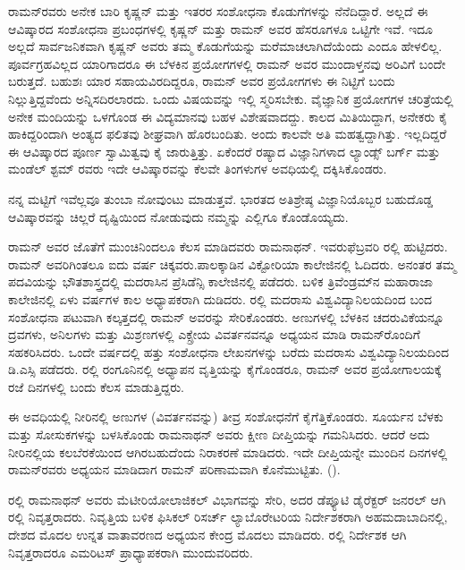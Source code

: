 ರಾಮನ್‍ರವರು ಅನೇಕ ಬಾರಿ ಕೃಷ್ಣನ್ ಮತ್ತು ಇತರರ ಸಂಶೋಧನಾ ಕೊಡುಗೆಗಳನ್ನು ನೆನೆದಿದ್ದಾರೆ. ಅಲ್ಲದೆ ಈ ಆವಿಷ್ಕಾರದ ಸಂಶೋಧನಾ ಪ್ರಬಂಧಗಳಲ್ಲಿ ಕೃಷ್ಣನ್ ಮತ್ತು ರಾಮನ್ ಅವರ ಹೆಸರೂಗಳೂ ಒಟ್ಟಿಗೇ ಇವೆ. ಇದೂ ಅಲ್ಲದೆ ಸಾರ್ವಜನಿಕವಾಗಿ ಕೃಷ್ಣನ್ ಅವರು ತಮ್ಮ ಕೊಡುಗೆಯನ್ನು ಮರೆಮಾಚಲಾಗಿದೆಯೆಂದು ಎಂದೂ ಹೇಳಲಿಲ್ಲ. ಪೂರ್ವಗ್ರಹವಿಲ್ಲದ ಯಾರಿಗಾದರೂ ಈ ಬೆಳಕಿನ ಪ್ರಯೋಗಗಳಲ್ಲಿ ರಾಮನ್ ಅವರ ಮುಂದಾಳ್ತನವು ಅರಿವಿಗೆ ಬಂದೇ ಬರುತ್ತದೆ. ಬಹುಶಃ ಯಾರ ಸಹಾಯವಿರದಿದ್ದರೂ, ರಾಮನ್ ಅವರ ಪ್ರಯೋಗಗಳು ಈ ನಿಟ್ಟಿಗೆ ಬಂದು ನಿಲ್ಲುತ್ತಿದ್ದವೆಂದು ಅನ್ನಿಸದಿರಲಾರದು. ಒಂದು ವಿಷಯವನ್ನು ಇಲ್ಲಿ ಸ್ಮರಿಸಬೇಕು. ವೈಜ್ಞಾನಿಕ ಪ್ರಯೋಗಗಳ ಚರಿತ್ರೆಯಲ್ಲಿ ಅನೇಕ ಮಂದಿಯನ್ನು ಒಳಗೊಂಡ ಈ ವಿದ್ಯಮಾನವು ಬಹಳ ವಿಶೇಷವಾದದ್ದು. ಕಾಲದ ಮಿತಿಯಿದ್ದಾಗ, ಅನೇಕರು ಕೈ ಹಾಕಿದ್ದರಿಂದಾಗಿ ಅಂತ್ಯದ ಫಲಿತವು ಶೀಘ್ರವಾಗಿ ಹೊರಬಂದಿತು. ಅಂದು ಕಾಲವೇ ಅತಿ ಮಹತ್ವದ್ದಾಗಿತ್ತು. ಇಲ್ಲದಿದ್ದರೆ ಈ ಆವಿಷ್ಕಾರದ ಪೂರ್ಣ ಸ್ವಾಮಿತ್ವವು ಕೈ ಜಾರುತ್ತಿತ್ತು. ಏಕೆಂದರೆ ರಷ್ಯಾದ ವಿಜ್ಞಾನಿಗಳಾದ ಲ್ಯಾಂಡ್ಸ್ ಬರ್ಗ್ ಮತ್ತು ಮಂಡೆಲ್ ಶ್ಟಮ್ ರವರು ಇದೇ ಆವಿಷ್ಕಾರವನ್ನು ಕೆಲವೇ ತಿಂಗಳುಗಳ ಅವಧಿಯಲ್ಲಿ ದಕ್ಕಿಸಿಕೊಂಡರು.

ನನ್ನ ಮಟ್ಟಿಗೆ ಇವೆಲ್ಲವೂ ತುಂಬಾ ನೋವುಂಟು ಮಾಡುತ್ತವೆ. ಭಾರತದ ಅತಿಶ್ರೇಷ್ಠ ವಿಜ್ಞಾನಿಯೊಬ್ಬರ ಬಹುದೊಡ್ಡ ಆವಿಷ್ಕಾರವನ್ನು ಚಿಲ್ಲರೆ ದೃಷ್ಟಿಯಿಂದ ನೋಡುವುದು ನಮ್ಮನ್ನು ಎಲ್ಲಿಗೂ ಕೊಂಡೊಯ್ಯದು.



ರಾಮನ್ ಅವರ ಜೊತೆಗೆ ಮುಂಚಿನಿಂದಲೂ ಕೆಲಸ ಮಾಡಿದವರು ರಾಮನಾಥನ್. ಇವರು\break ಫೆಬ್ರವರಿ ರಲ್ಲಿ ಹುಟ್ಟಿದರು. ರಾಮನ್ ಅವರಿಗಿಂತಲೂ ಐದು ವರ್ಷ ಚಿಕ್ಕವರು.\break ಪಾಲಕ್ಕಾಡಿನ ವಿಕ್ಟೋರಿಯಾ ಕಾಲೇಜಿನಲ್ಲಿ ಓದಿದರು. ಅನಂತರ ತಮ್ಮ ಪದವಿಯನ್ನು ಭೌತಶಾಸ್ತ್ರದಲ್ಲಿ ಮದರಾಸಿನ ಪ್ರೆಸಿಡೆನ್ಸಿ ಕಾಲೇಜಿನಲ್ಲಿ ಪಡೆದರು. ಬಳಿಕ ತ್ರಿವೆಂಡ್ರಮ್‍ನ ಮಹಾರಾಜಾ ಕಾಲೇಜಿನಲ್ಲಿ ಏಳು ವರ್ಷಗಳ ಕಾಲ ಅಧ್ಯಾಪಕರಾಗಿ ದುಡಿದರು. ರಲ್ಲಿ ಮದರಾಸು ವಿಶ್ವವಿದ್ಯಾನಿಲಯದಿಂದ ಬಂದ ಸಂಶೋಧನಾ ಪಟುವಾಗಿ ಕಲ್ಕತ್ತದಲ್ಲಿ ರಾಮನ್ ಅವರನ್ನು ಸೇರಿಕೊಂಡರು. ಅಣುಗಳಲ್ಲಿ ಬೆಳಕಿನ ಚದರುವಿಕೆಯನ್ನೂ ದ್ರವಗಳು, ಅನಿಲಗಳು ಮತ್ತು ಮಿಶ್ರಣಗಳಲ್ಲಿ ಎಕ್ಸ್\enginline{-}ರೇಯ ವಿವರ್ತನವನ್ನೂ ಅಧ್ಯಯನ ಮಾಡಿ ರಾಮನ್‍ರೊಂದಿಗೆ ಸಹಕರಿಸಿದರು. ಒಂದೇ ವರ್ಷದಲ್ಲಿ ಹತ್ತು ಸಂಶೋಧನಾ ಲೇಖನಗಳನ್ನು ಬರೆದು ಮದರಾಸು ವಿಶ್ವವಿದ್ಯಾನಿಲಯದಿಂದ ಡಿ.ಎಸ್ಸಿ ಪಡೆದರು. ರಲ್ಲಿ ರಂಗೂನಿನಲ್ಲಿ ಅಧ್ಯಾಪನ ವೃತ್ತಿಯನ್ನು ಕೈಗೊಂಡರೂ, ರಾಮನ್ ಅವರ ಪ್ರಯೋಗಾಲಯಕ್ಕೆ ರಜೆ ದಿನಗಳಲ್ಲಿ ಬಂದು ಕೆಲಸ ಮಾಡುತ್ತಿದ್ದರು.

ಈ ಅವಧಿಯಲ್ಲಿ ನೀರಿನಲ್ಲಿ ಅಣುಗಳ (ವಿವರ್ತನವನ್ನು) ತೀವ್ರ ಸಂಶೋಧನೆಗೆ ಕೈಗೆತ್ತಿಕೊಂಡರು. ಸೂರ್ಯನ ಬೆಳಕು ಮತ್ತು ಸೋಸುಕಗಳನ್ನು ಬಳಸಿಕೊಂಡು ರಾಮನಾಥನ್ ಅವರು ಕ್ಷೀಣ ದೀಪ್ತಿಯನ್ನು ಗಮನಿಸಿದರು. ಆದರೆ ಅದು ನೀರಿನಲ್ಲಿಯ ಕಲಬೆರಕೆಯಿಂದ ಆಗಿರಬಹುದೆಂದು ನಿರಾಕರಣೆ ಮಾಡಿದರು. ಇದೇ ದೀಪ್ತಿಯನ್ನೇ ಮುಂದಿನ ದಿನಗಳಲ್ಲಿ ರಾಮನ್‍ರವರು ಅಧ್ಯಯನ ಮಾಡಿದಾಗ ರಾಮನ್ ಪರಿಣಾಮವಾಗಿ ಕೊನೆಮುಟ್ಟಿತು. ().

ರಲ್ಲಿ ರಾಮನಾಥನ್ ಅವರು ಮೆಟೀರಿಯೋಲಾಜಿಕಲ್ ವಿಭಾಗವನ್ನು ಸೇರಿ, ಅದರ ಡೆಪ್ಯೂಟಿ ಡೈರೆಕ್ಟರ್ ಜನರಲ್ ಆಗಿ ರಲ್ಲಿ ನಿವೃತ್ತರಾದರು. ನಿವೃತ್ತಿಯ ಬಳಿಕ ಫಿಸಿಕಲ್ ರಿಸರ್ಚ್ ಲ್ಯಾಬೊರೇಟರಿಯ ನಿರ್ದೇಶಕರಾಗಿ ಅಹಮದಾಬಾದಿನಲ್ಲಿ, ದೇಶದ ಮೊದಲ ಉನ್ನತ ವಾತಾವರಣದ ಅಧ್ಯಯನ ಕೇಂದ್ರ ಮೊದಲು ಮಾಡಿದರು. ರಲ್ಲಿ ನಿರ್ದೇಶಕ ಆಗಿ ನಿವೃತ್ತರಾದರೂ ಎಮರಿಟಸ್ ಪ್ರಾಧ್ಯಾಪಕರಾಗಿ ಮುಂದುವರಿದರು.

